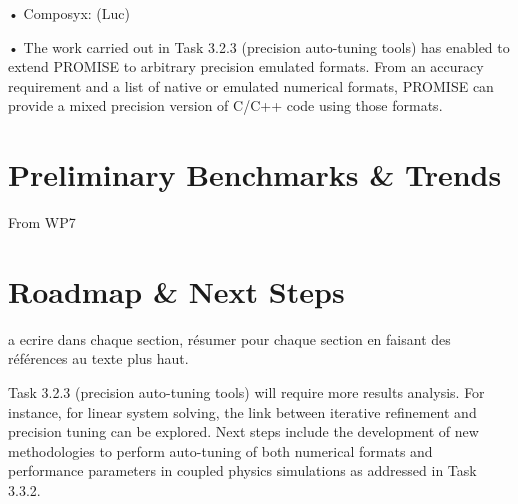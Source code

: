  • Composyx: (Luc)
 
 • %
The work carried out in Task 3.2.3 (precision auto-tuning tools) has enabled to extend PROMISE to arbitrary precision emulated formats. 
From an accuracy requirement and a list of native or emulated numerical formats, PROMISE can provide a mixed precision version of C/C++ code using those formats.

\section{Preliminary Benchmarks \& Trends}
From WP7 

\section{Roadmap \& Next Steps}

a ecrire dans chaque section, résumer pour chaque section en faisant des références au texte plus haut.

Task 3.2.3 (precision auto-tuning tools) will require 
more results analysis. For instance, for linear system solving, the link between iterative refinement and precision tuning can be explored.
Next steps include the development of new methodologies to perform auto-tuning of both numerical formats and performance parameters in coupled physics simulations as addressed in Task 3.3.2.









